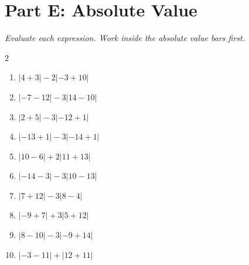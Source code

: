 \documentclass[11pt]{article}
\begin{document}
\section*{Part E: Absolute Value}
\noindent\textit{Evaluate each expression. Work inside the absolute value bars first.}
\begin{multicols}{2}
\begin{enumerate}
  \item $|4 + 3| - 2|-3 + 10|$
  \vspace{1.2cm}
  \item $|-7 - 12| - 3|14 - 10|$
  \vspace{1.2cm}
  \item $|2 + 5| - 3|-12 + 1|$
  \vspace{1.2cm}
  \item $|-13 + 1| - 3|-14 + 1|$
  \vspace{1.2cm}
  \item $|10 - 6| + 2|11 + 13|$
  \vspace{1.2cm}
  \item $|-14 - 3| - 3|10 - 13|$
  \vspace{1.2cm}
  \item $|7 + 12| - 3|8 - 4|$
  \vspace{1.2cm}
  \item $|-9 + 7| + 3|5 + 12|$
  \vspace{1.2cm}
  \item $|8 - 10| - 3|-9 + 14|$
  \vspace{1.2cm}
  \item $|-3 - 11| + |12 + 11|$
  \vspace{1.2cm}
\end{enumerate}
\end{multicols}
\end{document}
